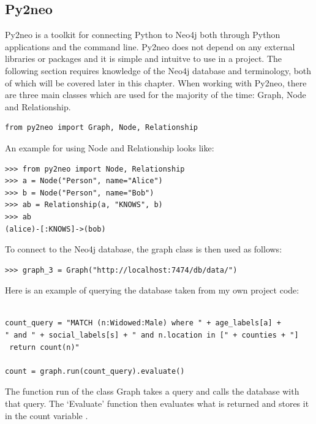 \subsection{Py2neo}
Py2neo is a toolkit for connecting Python to Neo4j both through Python applications and the command line. Py2neo does not depend on any external libraries or packages and it is simple and intuitve to use in a project. The following section requires knowledge of the Neo4j database and terminology, both of which will be covered later in this chapter.
When working with Py2neo,  there are three main classes which are used for the majority of the time: Graph, Node and Relationship.
\begin{verbatim}
from py2neo import Graph, Node, Relationship
\end{verbatim}
An example for using Node and Relationship looks like:
\begin{verbatim}
>>> from py2neo import Node, Relationship
>>> a = Node("Person", name="Alice")
>>> b = Node("Person", name="Bob")
>>> ab = Relationship(a, "KNOWS", b)
>>> ab
(alice)-[:KNOWS]->(bob)
\end{verbatim}
To connect to the Neo4j database, the graph class is then used as follows: 
\begin{verbatim}
>>> graph_3 = Graph("http://localhost:7474/db/data/")
\end{verbatim}
Here is an example of querying the database taken from my own project code:
\begin{verbatim}

count_query = "MATCH (n:Widowed:Male) where " + age_labels[a] + 
" and " + social_labels[s] + " and n.location in [" + counties + "]
 return count(n)"

count = graph.run(count_query).evaluate()
\end{verbatim}
The function run of the class Graph takes a query and calls the database with that query. The ‘Evaluate’ function  then evaluates what is returned and stores it in the count variable \cite{py2neo}.
